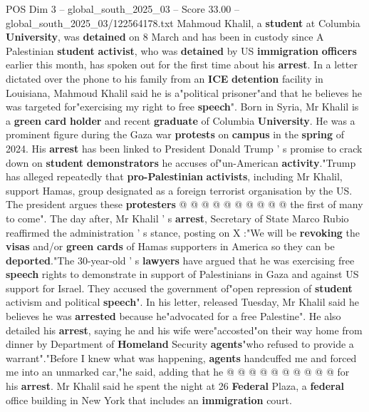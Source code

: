 \begin{textsample}{POS Dim 3 – global\_south\_2025\_03 – Score 33.00 – global\_south\_2025\_03/122564178.txt}  \label{ex:f3_pos_035}
Mahmoud Khalil, a \textbf{student} at Columbia \textbf{University}, was \textbf{detained} on 8 March and has been in custody since A Palestinian \textbf{student} \textbf{activist}, who was \textbf{detained} by US \textbf{immigration} \textbf{officers} earlier this month, has spoken out for the first time about his \textbf{arrest}.
In a letter dictated over the phone to his family from an \textbf{ICE} \textbf{detention} facility in Louisiana, Mahmoud Khalil said he is a"political prisoner"and that he believes he was targeted for"exercising my right to free \textbf{speech}".
Born in Syria, Mr Khalil is a \textbf{green} \textbf{card} \textbf{holder} and recent \textbf{graduate} of Columbia \textbf{University}.
He was a prominent figure during the Gaza war \textbf{protests} on \textbf{campus} in the \textbf{spring} of 2024.
His \textbf{arrest} has been linked to President Donald Trump ' s promise to crack down on \textbf{student} \textbf{demonstrators} he accuses of"un-American \textbf{activity}."Trump has alleged repeatedly that \textbf{pro-Palestinian} \textbf{activists}, including Mr Khalil, support Hamas, group designated as a foreign terrorist organisation by the US.
The president argues these \textbf{protesters} @ @ @ @ @ @ @ @ @ @ the first of many to come".
The day after, Mr Khalil ' s \textbf{arrest}, Secretary of State Marco Rubio reaffirmed the administration ' s stance, posting on X :"We will be \textbf{revoking} the \textbf{visas} and/or \textbf{green} \textbf{cards} of Hamas supporters in America so they can be \textbf{deported}."The 30-year-old ' s \textbf{lawyers} have argued that he was exercising free \textbf{speech} rights to demonstrate in support of Palestinians in Gaza and against US support for Israel.
They accused the government of"open repression of \textbf{student} activism and political \textbf{speech}".
In his letter, released Tuesday, Mr Khalil said he believes he was \textbf{arrested} because he"advocated for a free Palestine".
He also detailed his \textbf{arrest}, saying he and his wife were"accosted"on their way home from dinner by Department of \textbf{Homeland} Security \textbf{agents}"who refused to provide a warrant"."Before I knew what was happening, \textbf{agents} handcuffed me and forced me into an unmarked car,"he said, adding that he @ @ @ @ @ @ @ @ @ @ for his \textbf{arrest}.
Mr Khalil said he spent the night at 26 \textbf{Federal} Plaza, a \textbf{federal} office building in New York that includes an \textbf{immigration} court.

\end{textsample}

